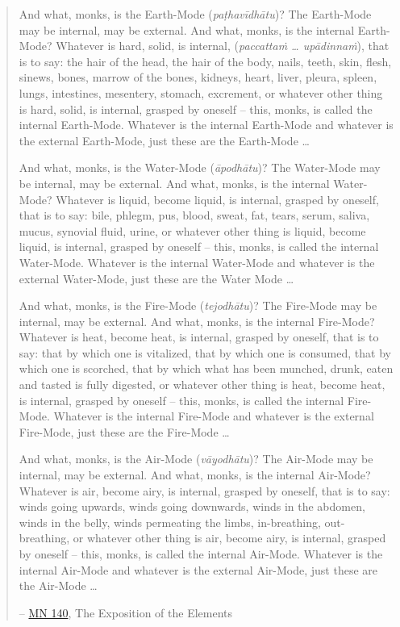\begin{quote}
And what, monks, is the Earth-Mode (\emph{paṭhavīdhātu})? The Earth-Mode may be internal, may be external. And what, monks, is the internal Earth-Mode? Whatever is hard, solid, is internal,  (\emph{paccattaṁ \ldots{} upādinnaṁ}), that is to say: the hair of the head, the hair of the body, nails, teeth, skin, flesh, sinews, bones, marrow of the bones, kidneys, heart, liver, pleura, spleen, lungs, intestines, mesentery, stomach, excrement, or whatever other thing is hard, solid, is internal, grasped by oneself -- this, monks, is called the internal Earth-Mode. Whatever is the internal Earth-Mode and whatever is the external Earth-Mode, just these are the Earth-Mode \ldots{}

And what, monks, is the Water-Mode (\emph{āpodhātu})? The Water-Mode may be internal, may be external. And what, monks, is the internal Water-Mode? Whatever is liquid, become liquid, is internal, grasped by oneself, that is to say: bile, phlegm, pus, blood, sweat, fat, tears, serum, saliva, mucus, synovial fluid, urine, or whatever other thing is liquid, become liquid, is internal, grasped by oneself -- this, monks, is called the internal Water-Mode. Whatever is the internal Water-Mode and whatever is the external Water-Mode, just these are the Water Mode \ldots{}

And what, monks, is the Fire-Mode (\emph{tejodhātu})? The Fire-Mode may be internal, may be external. And what, monks, is the internal Fire-Mode? Whatever is heat, become heat, is internal, grasped by oneself, that is to say: that by which one is vitalized, that by which one is consumed, that by which one is scorched, that by which what has been munched, drunk, eaten and tasted is fully digested, or whatever other thing is heat, become heat, is internal, grasped by oneself -- this, monks, is called the internal Fire-Mode. Whatever is the internal Fire-Mode and whatever is the external Fire-Mode, just these are the Fire-Mode \ldots{}

And what, monks, is the Air-Mode (\emph{vāyodhātu})? The Air-Mode may be internal, may be external. And what, monks, is the internal Air-Mode? Whatever is air, become airy, is internal, grasped by oneself, that is to say: winds going upwards, winds going downwards, winds in the abdomen, winds in the belly, winds permeating the limbs, in-breathing, out-breathing, or whatever other thing is air, become airy, is internal, grasped by oneself -- this, monks, is called the internal Air-Mode. Whatever is the internal Air-Mode and whatever is the external Air-Mode, just these are the Air-Mode \ldots{}

 -- \href{https://suttacentral.net/mn140/en/bodhi}{MN 140}, The Exposition of the Elements
\end{quote}


